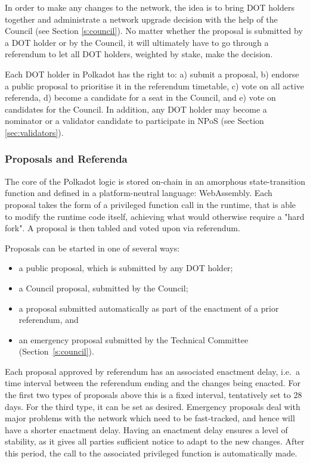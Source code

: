 \documentclass{article}
\begin{document}
In order to make any changes to the network, the idea is to bring DOT holders together and administrate a network upgrade decision with the help of the Council (see Section \ref{s:council}). No matter whether the proposal is submitted by a DOT holder or by the Council, it will ultimately have to go through a referendum to let all DOT holders, weighted by stake, make the decision.

Each DOT holder in Polkadot has the right to: a) submit a proposal, b) endorse a public proposal to prioritise it in the referendum timetable, c) vote on all active referenda, d) become a candidate for a seat in the Council, and e) vote on candidates for the Council. In addition, any DOT holder may become a nominator or a validator candidate to participate in NPoS (see Section \ref{sec:validators}).

\subsubsection{Proposals and Referenda}

The core of the Polkadot logic is stored on-chain in an amorphous state-transition function and defined in a platform-neutral language: WebAssembly. Each proposal takes the form of a privileged function call in the runtime, that is able to modify the runtime code itself, achieving what would otherwise require a "hard fork". A proposal is then tabled and voted upon via referendum. 

Proposals can be started in one of several ways:
\begin{itemize}
	\item a public proposal, which is submitted by any DOT holder;
	\item a Council proposal, submitted by the Council;
	\item a proposal submitted automatically as part of the enactment of a prior referendum, and
	\item an emergency proposal submitted by the Technical Committee (Section~\ref{s:council}).
\end{itemize} 

Each proposal approved by referendum has an associated enactment delay, i.e.~a time interval between the referendum ending and the changes being enacted. For the first two types of proposals above this is a fixed interval, tentatively set to 28 days. For the third type, it can be set as desired. Emergency proposals deal with major problems with the network which need to be fast-tracked, and hence will have a shorter enactment delay. Having an enactment delay ensures a level of stability, as it gives all parties sufficient notice to adapt to the new changes. After this period, the call to the associated privileged function is automatically made.  
\end{document}
